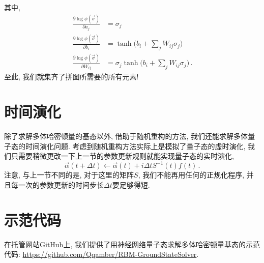 \documentclass[10pt]{article}
\begin{document}
其中,
\begin{align}
\frac{\partial\log\phi(\vec{\sigma})}{\partial a_{j}} & = \sigma_{j} \nonumber \\
\frac{\partial\log\phi(\vec{\sigma})}{\partial b_{i}} & = \tanh{\Big(b_{i}+\sum_{j}W_{ij}\sigma_{j}\Big)} \nonumber \\
\frac{\partial\log\phi(\vec{\sigma})}{\partial W_{ij}} & = \sigma_{j} \tanh{\Big(b_{i}+\sum_{j}W_{ij}\sigma_{j}\Big)}\,.
\end{align}
至此, 我们就集齐了拼图所需要的所有元素!


\section{时间演化}

除了求解多体哈密顿量的基态以外, 借助于随机重构的方法, 我们还能求解多体量子态的时间演化问题. 
考虑到随机重构方法实际上是模拟了量子态的虚时演化, 我们只需要稍微更改一下上一节的参数更新规则就能实现量子态的实时演化, 
\begin{equation}
\vec{\alpha}(t+\Delta{t}) \leftarrow \vec{\alpha}(t) + i \Delta{t} S^{-1}(t)f(t)\,.
\end{equation}
注意, 与上一节不同的是, 对于这里的矩阵$S$, 我们不能再用任何的正规化程序, 并且每一次的参数更新的时间步长$\Delta{t}$要足够得短. 


\section{示范代码}

在托管网站GitHub上, 我们提供了用神经网络量子态求解多体哈密顿量基态的示范代码: \url{https://github.com/Qqamber/RBM-GroundStateSolver}.



\end{document}
